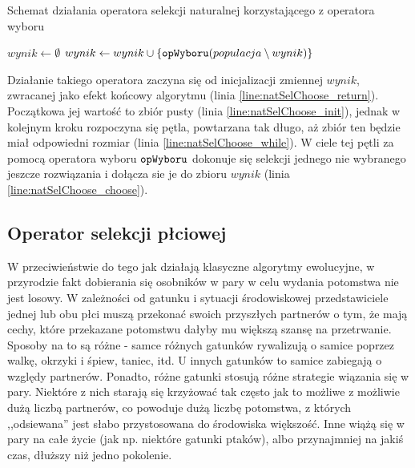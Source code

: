 \documentclass[./FM_mgr.tex]{subfiles}
\begin{document}
\begin{algorithm}[h]
	\caption{Schemat działania operatora selekcji naturalnej korzystającego z operatora wyboru \label{algorithm:natSel_choose}}
	\begin{algorithmic}[1]
		\Start
		\Var $wynik \gets \emptyset$ 
		\label{line:natSelChoose_init}
		\label{line:natSelChoose_while}
		\State $wynik \gets wynik \cup \{ \mathtt{opWyboru}(populacja \setminus wynik) \}$
		\label{line:natSelChoose_choose}
		\EndWhile
		\State {}
		\label{line:natSelChoose_return}
		\EndOperator
	\end{algorithmic}
\end{algorithm}

Działanie takiego operatora zaczyna się od inicjalizacji zmiennej $wynik$, zwracanej jako efekt końcowy algorytmu (linia \ref{line:natSelChoose_return}). 
Początkowa jej wartość to zbiór pusty (linia \ref{line:natSelChoose_init}), jednak w kolejnym kroku rozpoczyna się pętla, powtarzana tak długo, aż zbiór ten będzie miał odpowiedni rozmiar (linia \ref{line:natSelChoose_while}).
W ciele tej pętli za pomocą operatora wyboru $\mathtt{opWyboru}$ dokonuje się selekcji jednego nie wybranego jeszcze rozwiązania i dołącza sie je do zbioru $wynik$ (linia \ref{line:natSelChoose_choose}).

\subsection{Operator selekcji płciowej} \label{subsection:new_genSel}

W przeciwieństwie do tego jak działają klasyczne algorytmy ewolucyjne, w przyrodzie fakt dobierania się osobników w pary w celu wydania potomstwa nie jest losowy.
W zależności od gatunku i sytuacji środowiskowej przedstawiciele jednej lub obu płci muszą przekonać swoich przyszłych partnerów o tym, że mają cechy, które przekazane potomstwu dałyby mu większą szansę na przetrwanie.
Sposoby na to są różne - samce różnych gatunków rywalizują o samice poprzez walkę, okrzyki i śpiew, taniec, itd. 
U innych gatunków to samice zabiegają o względy partnerów.
Ponadto, różne gatunki stosują różne strategie wiązania się w pary.
Niektóre z nich starają się krzyżować tak często jak to możliwe z możliwie dużą liczbą partnerów, co powoduje dużą liczbę potomstwa, z których ,,odsiewana'' jest słabo przystosowana do środowiska większość.
Inne wiążą się w pary na całe życie (jak np. niektóre gatunki ptaków), albo przynajmniej na jakiś czas, dłuższy niż jedno pokolenie.
\end{document}
